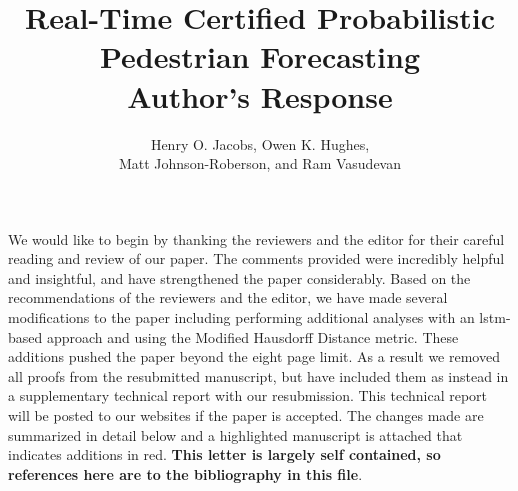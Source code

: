 \documentclass[usenames,dvipsnames]{article}
\title{\LARGE Real-Time Certified Probabilistic Pedestrian Forecasting \\ \textbf{Author's Response} }
\author{Henry O. Jacobs, Owen K. Hughes, \\ Matt Johnson-Roberson, and Ram Vasudevan }
\newcommand{\todo}[1]{\textcolor{red}{#1}}
\begin{document}
\maketitle


We would like to begin by thanking the reviewers and the editor for their careful reading and review of our paper.
The comments provided were incredibly helpful and insightful, and have strengthened the paper considerably.
Based on the recommendations of the reviewers and the editor, we have made several modifications to the paper including performing additional analyses with an lstm-based approach and using the Modified Hausdorff Distance metric. 
These additions pushed the paper beyond the eight page limit. 
As a result we removed all proofs from the resubmitted manuscript, but have included them as instead in a supplementary technical report with our resubmission.
This technical report will be posted to our websites if the paper is accepted. 
The changes made are summarized in detail below and a highlighted manuscript is attached that indicates additions in red. \textbf{This letter is largely self contained, so references here are to the bibliography in this file}.
\end{document}
